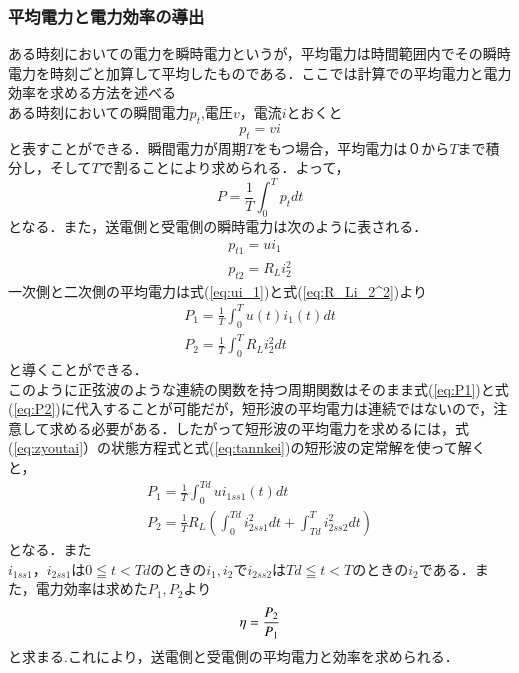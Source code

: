 \documentclass[12pt]{jarticle}
\begin{document}
\subsubsection{平均電力と電力効率の導出}
ある時刻においての電力を瞬時電力というが，平均電力は時間範囲内でその瞬時電力を時刻ごと加算して平均したものである．ここでは計算での平均電力と電力効率を求める方法を述べる　\\ある時刻においての瞬間電力$p_t$,電圧$v$，電流$i$とおくと
\begin{equation}
p_t=vi
\end{equation}
と表すことができる．瞬間電力が周期$T$をもつ場合，平均電力は０から$T$まで積分し，そして$T$で割ることにより求められる．よって，
\begin{equation}
P=\frac{1}{T}\int_{0}^{T}p_tdt
\end{equation}
となる．また，送電側と受電側の瞬時電力は次のように表される．
\begin{eqnarray}
\label{eq:ui_1}
p_{t1}=ui_1\\
\label{eq:R_Li_2^2}
p_{t2}=R_Li_2^2
\end{eqnarray}
一次側と二次側の平均電力は式(\ref{eq:ui_1})と式(\ref{eq:R_Li_2^2})より
\begin{eqnarray}
\label{eq:P1}
P_1=\frac{1}{T}\int_{0}^{T}u(t)i_1(t)dt\\
\label{eq:P2}
P_2=\frac{1}{T}\int_{0}^{T}R_Li_2^2dt
\end{eqnarray}
と導くことができる．\\
 このように正弦波のような連続の関数を持つ周期関数はそのまま式(\ref{eq:P1})と式(\ref{eq:P2})に代入することが可能だが，短形波の平均電力は連続ではないので，注意して求める必要がある．したがって短形波の平均電力を求めるには，式(\ref{eq:zyoutai}）の状態方程式と式(\ref{eq:tannkei})の短形波の定常解を使って解くと，
 \begin{eqnarray}
 P_1=\frac{1}{T}\int_{0}^{Td}ui_{1ss1}(t)dt\\
 P_2=\frac{1}{T}R_L(\int_{0}^{Td}i_{2ss1}^2dt+\int_{Td}^{T}i_{2ss2}^2dt)
 \end{eqnarray}
 となる．また$i_{1ss1}，i_{2ss1}は0 \leqq t < Tdのときのi_1,i_2でi_{2ss2}はTd \leqq t <Tのときのi_2である．$また，電力効率は$求めたP_1,P_2より$
 \begin{equation}
 \eta=\frac{P_2}{P_1}\\
 \label{eq:kouritu}
 \end{equation}
 と求まる.これにより，送電側と受電側の平均電力と効率を求められる．
 \clearpage
\end{document}
